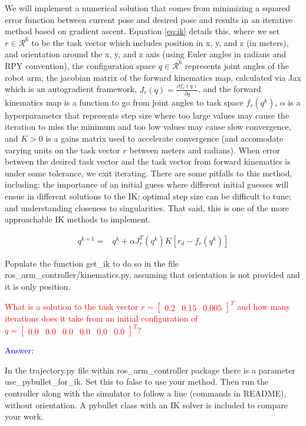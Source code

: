 \documentclass[11pt,a4paper]{article}
\begin{document}
We will implement a numerical solution that comes from minimizing a squared error function between current pose and desired pose and results in an iterative method based on gradient ascent. Equation \eqref{eq:ik} details this, where we set $r \in \mathcal{R}^6$ to be the task vector which includes position in x, y, and z (in meters), and orientation around the x, y, and z axis (using Euler angles in radians and RPY convention), the configuration space $q \in \mathcal{R}^6$ represents joint angles of the robot arm, the jacobian matrix of the forward kinematics map, calculated via Jax which is an autogradient framework, $J_r(q) = \frac{\partial f_r(q)}{\partial q}$, and the forward kinematics map is a function to go from joint angles to task space $f_r(q^k)$, $\alpha$ is a hyperparameter that represents step size where too large values may cause the iteration to miss the minimum and too low values may cause slow convergence, and $K>0$ is a gains matrix used to accelerate convergence (and accomodate varying units on the task vector $r$ between meters and radians). When error between the desired task vector and the task vector from forward kinematics is under some tolerance, we exit iterating. There are some pitfalls to this method, including: the importance of an initial guess where different initial guesses will ensue in different solutions to the IK; optimal step size can be difficult to tune; and understanding closeness to singularities. That said, this is one of the more approachable IK methods to implement.

\begin{align}
q^{k+1} =& q^k + \alpha J_r^T (q^k) K \left[ r_d - f_r(q^k) \right] \label{eq:ik}
\end{align}

Populate the function get\_ik to do so in the file ros\_arm\_controller/kinematics.py, assuming that orientation is not provided and it is only position.


\textcolor{red}{ What is a solution to the task vector $r=\begin{bmatrix} 0.2& 0.15& 0.005\end{bmatrix}^T$ and how many iterations does it take from an initial configuration of $q = \begin{bmatrix} 0.0& 0.0& 0.0& 0.0& 0.0& 0.0 \end{bmatrix}^T$?}

\textcolor{blue}{Answer: }


In the trajectory.py file within ros\_arm\_controller package there is a parameter use\_pybullet\_for\_ik. Set this to false to use your method. Then run the controller along with the simulator to follow a line (commands in README), without orientation. A pybullet class with an IK solver is included to compare your work.
\end{document}
